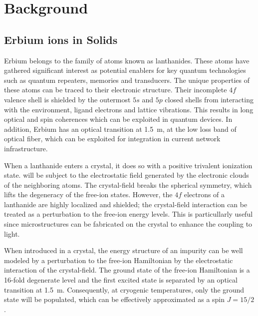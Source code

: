 \chapter{Background}

\section{Erbium ions in Solids}

Erbium belongs to the family of atoms known as lanthanides. These atoms have gathered significant interest as potential enablers for key quantum technologies such as quantum repeaters, memories and transducers. The unique properties of these atoms can be traced to their electronic structure. Their incomplete $4f$ valence shell is shielded by the outermost $5s$ and $5p$ closed shells from interacting with the environment, ligand electrons and lattice vibrations. This results in long optical and spin coherences which can be exploited in quantum devices. In addition, Erbium has an optical transition at 1.5~\textmu m, at the low loss band of optical fiber, which can be exploited for integration in current network infrastructure.

When a lanthanide enters a crystal, it does so with a positive trivalent ionization state. will be subject to the electrostatic field generated by the electronic clouds of the neighboring atoms. The crystal-field breaks the spherical symmetry, which lifts the degeneracy of the free-ion states. However, the $4f$ electrons of a lanthanide are highly localized and shielded; the crystal-field interaction can be treated as a perturbation to the free-ion energy levels. This is particullarly useful since microstructures can be fabricated on the crystal to enhance the coupling to light. 


When introduced in a crystal, the energy structure of an \Er impurity can be well modeled by a perturbation to the free-ion Hamiltonian by the electrostatic interaction of the crystal-field. The ground state of the free-ion Hamiltonian is a 16-fold degenerate level and the first excited state is separated by an optical transition at 1.5~\textmu m. Consequently, at cryogenic temperatures, only the ground state will be populated, which can be effectively approximated as a spin $J=15/2$.

